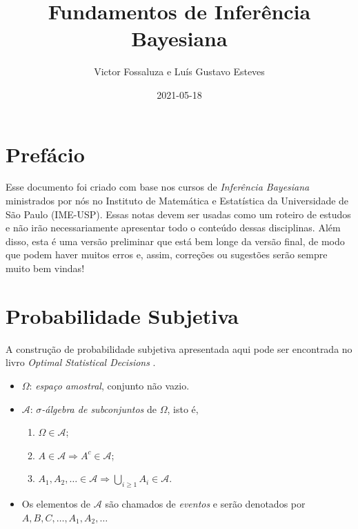 \documentclass[
]{book}
\title{Fundamentos de Inferência Bayesiana}
\author{Victor Fossaluza e Luís Gustavo Esteves}
\date{2021-05-18}
\providecommand{\tightlist}{%
  \setlength{\itemsep}{0pt}\setlength{\parskip}{0pt}}
\begin{document}
\maketitle

{
\setcounter{tocdepth}{1}
\tableofcontents
}
\hypertarget{prefuxe1cio}{%
\chapter{Prefácio}\label{prefuxe1cio}}

Esse documento foi criado com base nos cursos de \emph{Inferência Bayesiana} ministrados por nós no Instituto de Matemática e Estatística da Universidade de São Paulo (IME-USP). Essas notas devem ser usadas como um roteiro de estudos e não irão necessariamente apresentar todo o conteúdo dessas disciplinas. Além disso, esta é uma versão preliminar que está bem longe da versão final, de modo que podem haver muitos erros e, assim, correções ou sugestões serão sempre muito bem vindas!

\hypertarget{ProbSubj}{%
\chapter{Probabilidade Subjetiva}\label{ProbSubj}}

A construção de probabilidade subjetiva apresentada aqui pode ser encontrada no livro \emph{Optimal Statistical Decisions} \citep{DeGroot70}.

\begin{itemize}
\item
  \(\Omega\): \emph{espaço amostral}, conjunto não vazio.
\item
  \(\mathcal{A}\): \emph{\(\sigma\)-álgebra de subconjuntos} de \(\Omega\), isto é,

  \begin{enumerate}
  \def\labelenumi{\arabic{enumi}.}
  \tightlist
  \item
    \(\Omega \in \mathcal{A}\);
  \item
    \(A \in \mathcal{A} \Longrightarrow A^{c} \in \mathcal{A}\);
  \item
    \(\displaystyle A_1, A_2, \ldots \in \mathcal{A} \Longrightarrow \bigcup_{i\geq1} A_i \in \mathcal{A}\).
  \end{enumerate}
\item
  Os elementos de \(\mathcal{A}\) são chamados de \emph{eventos} e serão denotados por \(A, B, C, \ldots, A_1, A_2, \ldots\)
\end{itemize}
\end{document}
